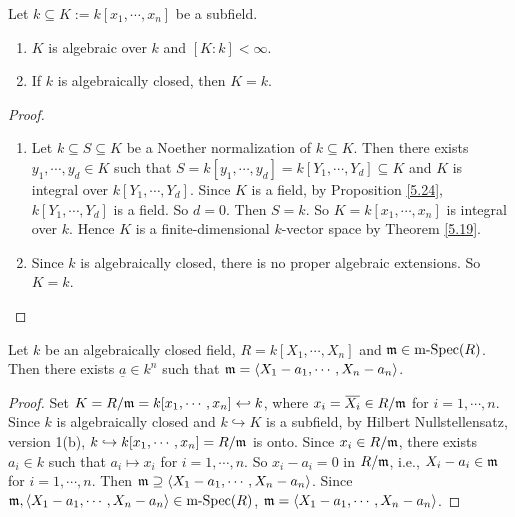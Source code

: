 \begin{theorem}\label{5.41}
    Let $k \subseteq K := k[x_1,\cdots,x_n]$ be a subfield.
    \begin{enumerate}
        \item $K$ is algebraic over $k$ and $[K:k] < \infty$.
        \item If $k$ is algebraically closed, then $K = k$.
    \end{enumerate}
\end{theorem}

\begin{proof}
    \begin{enumerate}
        \item Let $k \subseteq S \subseteq K$ be a Noether normalization of $k \subseteq K$. Then there exists $y_1,\cdots,y_d \in K$ such that $S = k[y_1,\cdots,y_d] = k[Y_1,\cdots,Y_d] \subseteq K$ and $K$ is integral over $k[Y_1,\cdots,Y_d]$. Since $K$ is a field, by Proposition \ref{5.24}, $k[Y_1,\cdots,Y_d]$ is a field. So $d = 0$. Then $S = k$. So $K = k[x_1,\cdots,x_n]$ is integral over $k$. Hence $K$ is a finite-dimensional $k$-vector space by Theorem \ref{5.19}.
        \item Since $k$ is algebraically closed, there is no proper algebraic extensions. So $K = k$. \qedhere
    \end{enumerate}
\end{proof}

\begin{theorem}\label{5.42}
    Let $k$ be an algebraically closed field, $R = k[X_1,\cdots,X_n]$ and $\mathfrak{m} \in \operatorname{m-Spec}(R)$. Then there exists $\underline a \in k^{n}$ such that $\mathfrak{m} = \langle X_1-a_1,\cdots,X_n-a_n \rangle$.
\end{theorem}

\begin{proof}
    Set $K = R/\mathfrak{m} = k[x_1,\cdots,x_n] \hookleftarrow k$, where $x_i = \overbar{X_i} \in R/\ffm$ for $i = 1,\cdots,n$. Since $k$ is algebraically closed and $k \hookrightarrow K$ is a subfield, by Hilbert Nullstellensatz, version 1(b), $k \hookrightarrow k[x_1,\cdots,x_n] = R/\mathfrak{m}$ is onto. Since $x_i \in R/\mathfrak{m}$, there exists $a_i \in k$ such that $a_i \mapsto x_i$ for $i = 1,\cdots,n$. So $x_i - a_i = 0$ in $R/\mathfrak{m}$, i.e., $X_i - a_i \in \mathfrak{m}$ for $i = 1,\cdots,n$. Then $\mathfrak{m} \supseteq \langle X_1-a_1,\cdots,X_n-a_n \rangle$. Since $\mathfrak{m},\langle X_1-a_1,\cdots,X_n-a_n \rangle \in \operatorname{m-Spec}(R)$, $\mathfrak{m} = \langle X_1-a_1,\cdots,X_n-a_n \rangle$.
\end{proof}

